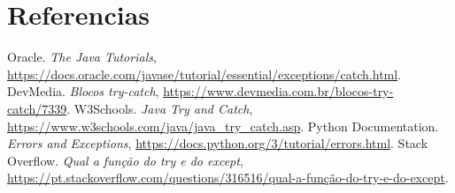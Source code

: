 \documentclass[12pt,a4paper]{article}
\begin{document}
\section{Referencias}
\begin{thebibliography}{99}
 Oracle. \emph{The Java Tutorials}, \url{https://docs.oracle.com/javase/tutorial/essential/exceptions/catch.html}.
 DevMedia. \emph{Blocos try-catch}, \url{https://www.devmedia.com.br/blocos-try-catch/7339}.
 W3Schools. \emph{Java Try and Catch}, \url{https://www.w3schools.com/java/java_try_catch.asp}.
 Python Documentation. \emph{Errors and Exceptions}, \url{https://docs.python.org/3/tutorial/errors.html}.
 Stack Overflow. \emph{Qual a função do try e do except}, \url{https://pt.stackoverflow.com/questions/316516/qual-a-função-do-try-e-do-except}.
\end{thebibliography}
\end{document}
